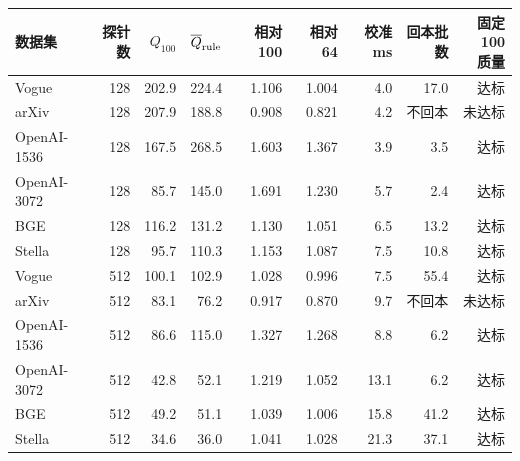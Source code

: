 \begin{tabular}{@{}lrrrrrrrr@{}}
\toprule
数据集 & 探针数 & $Q_{100}$ & $\overline Q_{\rm rule}$ & 相对 100 & 相对 64 & 校准 ms & 回本批数 & \shortstack{固定 100\\质量} \\
\midrule
Vogue & 128 & 202.9 & 224.4 & 1.106 & 1.004 & 4.0 & 17.0 & 达标 \\
arXiv & 128 & 207.9 & 188.8 & 0.908 & 0.821 & 4.2 & 不回本 & 未达标 \\
OpenAI-1536 & 128 & 167.5 & 268.5 & 1.603 & 1.367 & 3.9 & 3.5 & 达标 \\
OpenAI-3072 & 128 & 85.7 & 145.0 & 1.691 & 1.230 & 5.7 & 2.4 & 达标 \\
BGE & 128 & 116.2 & 131.2 & 1.130 & 1.051 & 6.5 & 13.2 & 达标 \\
Stella & 128 & 95.7 & 110.3 & 1.153 & 1.087 & 7.5 & 10.8 & 达标 \\
Vogue & 512 & 100.1 & 102.9 & 1.028 & 0.996 & 7.5 & 55.4 & 达标 \\
arXiv & 512 & 83.1 & 76.2 & 0.917 & 0.870 & 9.7 & 不回本 & 未达标 \\
OpenAI-1536 & 512 & 86.6 & 115.0 & 1.327 & 1.268 & 8.8 & 6.2 & 达标 \\
OpenAI-3072 & 512 & 42.8 & 52.1 & 1.219 & 1.052 & 13.1 & 6.2 & 达标 \\
BGE & 512 & 49.2 & 51.1 & 1.039 & 1.006 & 15.8 & 41.2 & 达标 \\
Stella & 512 & 34.6 & 36.0 & 1.041 & 1.028 & 21.3 & 37.1 & 达标 \\
\bottomrule
\end{tabular}
